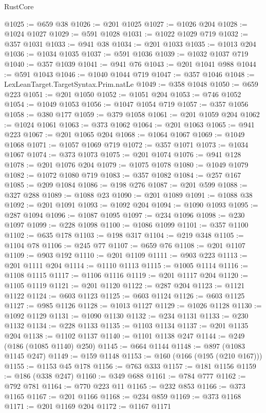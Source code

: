 \begin{lexlean}{RustCore}
\begin{coremodule}
@1025 := @659 @38
@1026 := @201 @1025
@1027 := @1026 @204
@1028 := @1024 @1027
@1029 := @591 @1028
@1031 := @1022 @1029 @719
@1032 := @357 @1031
@1033 := @941 @38
@1034 := @201 @1033
@1035 := @1013 @204
@1036 := @1034 @1035
@1037 := @591 @1036
@1039 := @1032 @1037 @719
@1040 := @357 @1039
@1041 := @941 @76
@1043 := @201 @1041 @988
@1044 := @591 @1043
@1046 := @1040 @1044 @719
@1047 := @357 @1046
@1048 := LexLeanTarget.TargetSyntax.Prim.natLe
@1049 := @358 @1048
@1050 := @659 @223
@1051 := @201 @1050
@1052 := @1051 @204
@1053 := @746 @1052
@1054 := @1049 @1053
@1056 := @1047 @1054 @719
@1057 := @357 @1056
@1058 := @380 @177
@1059 := @379 @1058
@1061 := @201 @1059 @204
@1062 := @1024 @1061
@1063 := @373 @1062
@1064 := @201 @1063
@1065 := @941 @223
@1067 := @201 @1065 @204
@1068 := @1064 @1067
@1069 := @1049 @1068
@1071 := @1057 @1069 @719
@1072 := @357 @1071
@1073 := @1034 @1067
@1074 := @373 @1073
@1075 := @201 @1074
@1076 := @941 @128
@1078 := @201 @1076 @204
@1079 := @1075 @1078
@1080 := @1049 @1079
@1082 := @1072 @1080 @719
@1083 := @357 @1082
@1084 := @257 @167
@1085 := @209 @1084
@1086 := @198 @276
@1087 := @201 @599
@1088 := @327 @288
@1089 := @1088 @23
@1090 := @201 @1089
@1091 := @1088 @38
@1092 := @201 @1091
@1093 := @1092 @204
@1094 := @1090 @1093
@1095 := @287 @1094
@1096 := @1087 @1095
@1097 := @234 @1096
@1098 := @230 @1097
@1099 := @228 @1098
@1100 := @1086 @1099
@1101 := @357 @1100
@1102 := @635 @178
@1103 := @198 @317
@1104 := @219 @348
@1105 := @1104 @78
@1106 := @245 @77
@1107 := @659 @76
@1108 := @201 @1107
@1109 := @903 @192
@1110 := @201 @1109
@1111 := @903 @223
@1113 := @201 @1111 @204
@1114 := @1110 @1113
@1115 := @1005 @1114
@1116 := @1108 @1115
@1117 := @1106 @1116
@1119 := @201 @1117 @204
@1120 := @1105 @1119
@1121 := @201 @1120
@1122 := @287 @204
@1123 := @1121 @1122
@1124 := @603 @1123
@1125 := @603 @1124
@1126 := @603 @1125
@1127 := @985 @1126
@1128 := @1013 @1127
@1129 := @1026 @1128
@1130 := @1092 @1129
@1131 := @1090 @1130
@1132 := @234 @1131
@1133 := @230 @1132
@1134 := @228 @1133
@1135 := @1103 @1134
@1137 := @201 @1135 @204
@1138 := @1102 @1137
@1140 := @1101 @1138 @247
@1144 := @249 (@186 (@1085 @1140) @250)
@1145 := @664 @1144
@1148 := @897 (@1083 @1145 @247)
@1149 := @159 @1148
@1153 := @160 (@166 (@195 (@210 @167)))
@1155 := @1153 @45 @178
@1156 := @763 @333
@1157 := @181 @1156
@1159 := @186 (@338 @247)
@1160 := @349 @688
@1161 := @784 @777
@1162 := @792 @781
@1164 := @770 @223 @11
@1165 := @232 @853
@1166 := @373 @1165
@1167 := @201 @1166
@1168 := @234 @859
@1169 := @373 @1168
@1171 := @201 @1169 @204
@1172 := @1167 @1171

\end{coremodule}
\end{lexlean}

